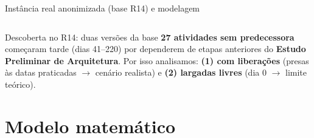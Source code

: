 \documentclass[aspectratio=169]{beamer}
\begin{document}
\begin{frame}{Instância real anonimizada (base R14) e modelagem}
\begin{columns}[T,onlytextwidth]
\end{columns}

\vspace{0.22cm}

\begin{alertblock}{Descoberta no R14: duas versões da base}
\scriptsize
\textbf{27 atividades sem predecessora} começaram tarde (dias 41--220) por dependerem de etapas anteriores do \textbf{Estudo Preliminar de Arquitetura}. Por isso analisamos: \textbf{(1) com liberações} (presas às datas praticadas $\rightarrow$ cenário realista) e \textbf{(2) largadas livres} (dia 0 $\rightarrow$ limite teórico).
\end{alertblock}

\end{frame}

\section{Modelo matemático}
\end{document}
